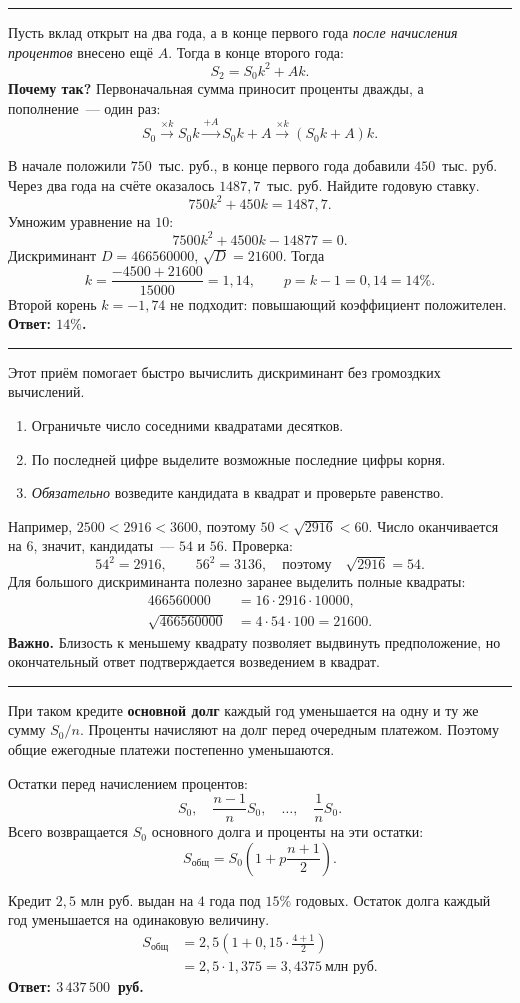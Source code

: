 \documentclass[a4paper,12pt]{article}
\newcommand{\key}[1]{\textcolor{darkaccent}{\textbf{#1}}}
\newcommand{\microhead}[1]{\vspace{2mm}{\large\textcolor{darkaccent}{\bfseries #1}}\par\vspace{1mm}}
\newcommand{\topic}[1]{\vspace{4mm}{\Large\textcolor{darkaccent}{\bfseries #1}}\par\vspace{1mm}\textcolor{rulegray}{\rule{\linewidth}{0.35pt}}\vspace{2mm}}
\begin{document}
\topic{2. Вклад с пополнением}
Пусть вклад открыт на два года, а в конце первого года \emph{после начисления процентов} внесено ещё $A$. Тогда в конце второго года:
\[
\boxed{S_2=S_0k^2+Ak.}
\]
\textbf{Почему так?} Первоначальная сумма приносит проценты дважды, а пополнение~--- один раз:
\[
S_0\xrightarrow{\times k}S_0k\xrightarrow{+A}S_0k+A
\xrightarrow{\times k}(S_0k+A)k.
\]

\microhead{Пример. Найти процентную ставку}
В начале положили $750$~тыс. руб., в конце первого года добавили $450$~тыс. руб. Через два года на счёте оказалось $1487{,}7$~тыс. руб. Найдите годовую ставку.
\[
750k^2+450k=1487{,}7.
\]
Умножим уравнение на $10$:
\[
7500k^2+4500k-14877=0.
\]
Дискриминант $D=466560000$, $\sqrt D=21600$. Тогда
\[
k=\frac{-4500+21600}{15000}=1{,}14,
\qquad p=k-1=0{,}14=14\%.
\]
Второй корень $k=-1{,}74$ не подходит: повышающий коэффициент положителен. \key{Ответ: $14\%$.}

\topic{3. Как извлечь корень из большого числа}
Этот приём помогает быстро вычислить дискриминант без громоздких вычислений.
\begin{enumerate}[label=\arabic*.]
\item Ограничьте число соседними квадратами десятков.
\item По последней цифре выделите возможные последние цифры корня.
\item \emph{Обязательно} возведите кандидата в квадрат и проверьте равенство.
\end{enumerate}
Например, $2500<2916<3600$, поэтому $50<\sqrt{2916}<60$. Число оканчивается на $6$, значит, кандидаты~--- $54$ и $56$. Проверка:
\[
54^2=2916,\qquad 56^2=3136,
\quad\text{поэтому}\quad\boxed{\sqrt{2916}=54}.
\]
Для большого дискриминанта полезно заранее выделить полные квадраты:
\[
\begin{aligned}
466560000&=16\cdot2916\cdot10000,\\
\sqrt{466560000}&=4\cdot54\cdot100=21600.
\end{aligned}
\]
\textbf{Важно.} Близость к меньшему квадрату позволяет выдвинуть предположение, но окончательный ответ подтверждается возведением в квадрат.

\topic{4. Дифференцированный кредит}
При таком кредите \key{основной долг} каждый год уменьшается на одну и ту же сумму $S_0/n$. Проценты начисляют на долг перед очередным платежом. Поэтому общие ежегодные платежи постепенно уменьшаются.

Остатки перед начислением процентов:
\[
S_0,\quad \frac{n-1}{n}S_0,\quad\ldots,\quad \frac1nS_0.
\]
Всего возвращается $S_0$ основного долга и проценты на эти остатки:
\[
\boxed{S_{\text{общ}}=S_0\left(1+p\frac{n+1}{2}\right).}
\]
\microhead{Пример. Общая сумма выплат}
Кредит $2{,}5$ млн руб. выдан на $4$ года под $15\%$ годовых. Остаток долга каждый год уменьшается на одинаковую величину.
\[
\begin{aligned}
S_{\text{общ}}&=2{,}5\left(1+0{,}15\cdot\frac{4+1}{2}\right)\\
&=2{,}5\cdot1{,}375=3{,}4375\ \text{млн руб.}
\end{aligned}
\]
\key{Ответ: $3\,437\,500$~руб.}
\end{document}
